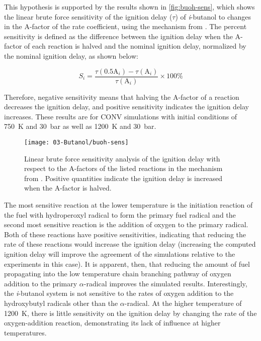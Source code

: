 \documentclass[12pt, letterpaper]{article}
\begin{document}
This hypothesis is supported by the results shown in \autoref{fig:buoh-sens},
which shows the linear brute force sensitivity of the ignition delay ($\tau$)
of \textit{i}-butanol to changes in the $\mathrm{A}$-factor of the rate coefficient, using
the mechanism from \textcite{Sarathy2012}. The percent sensitivity is defined
as the difference between the ignition delay when the $\mathrm{A}$-factor of each reaction
is halved and the nominal ignition delay, normalized by the nominal ignition
delay, as shown below:

\begin{equation}
    \label{eq:buoh-sens}
    S_i=\frac{\tau(0.5\mathrm{A}_i )-\tau(\mathrm{A}_i )}{\tau(\mathrm{A}_i)} \times 100\%
\end{equation}

Therefore, negative sensitivity means that halving the $\mathrm{A}$-factor of a reaction
decreases the ignition delay, and positive sensitivity indicates the ignition
delay increases. These results are for CONV simulations with initial conditions
of \SI{750}{\kelvin} and \SI{30}{\bar} as well as \SI{1200}{\kelvin} and \SI{30}{\bar}.

\begin{figure}
    \texttt{[image: 03-Butanol/buoh-sens]}
    \caption{Linear brute force sensitivity analysis of the ignition delay with
        respect to the A-factors of the listed reactions in the mechanism from
        \textcite{Sarathy2012}. Positive quantities indicate the ignition delay
        is increased when the A-factor is halved.}
    \label{fig:buoh-sens}
\end{figure}

The most sensitive reaction at the lower temperature is the initiation reaction
of the fuel with hydroperoxyl radical to form the primary fuel radical and the
second most sensitive reaction is the addition of oxygen to the primary
radical. Both of these reactions have positive sensitivities, indicating that
reducing the rate of these reactions would increase the ignition delay
(increasing the computed ignition delay will improve the agreement of the
simulations relative to the experiments in this case). It is apparent, then,
that reducing the amount of fuel propagating into the low temperature chain
branching pathway of oxygen addition to the primary $\alpha$-radical improves
the simulated results. Interestingly, the \textit{i}-butanol system is not
sensitive to the rates of oxygen addition to the hydroxybutyl radicals other
than the $\alpha$-radical. At the higher temperature of \SI{1200}{\kelvin}, there is little
sensitivity on the ignition delay by changing the rate of the oxygen-addition
reaction, demonstrating its lack of influence at higher temperatures.
\end{document}
